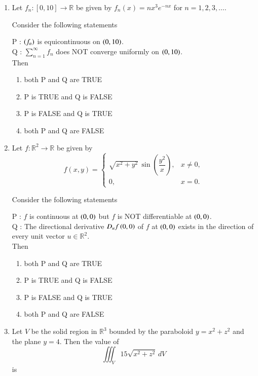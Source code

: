 \documentclass[journal,12pt,onecolumn]{IEEEtran}
\theoremstyle{remark}
\begin{document}
\begin{enumerate}[start=1, label=Q.\arabic*]
\hfill{}
\item Let $f_{n}: [0,10]\to \mathbb{R}$ be given by $f_{n}(x)=n x^{3}e^{-nx}$ for $n=1,2,3,\dots$.  

Consider the following statements\brak{:}

P : $\left(f_{n}\right)$ is equicontinuous on $\left(0,10\right)$.\\
Q : $\sum_{n=1}^{\infty} f_{n}$ does NOT converge uniformly on $\left(0,10\right)$.\\

Then
\begin{enumerate}
\item both P and Q are TRUE
\item P is TRUE and Q is FALSE
\item P is FALSE and Q is TRUE
\item both P and Q are FALSE
\end{enumerate}

\hfill{}


\item Let $f: \mathbb{R}^{2}\to \mathbb{R}$ be given by
\[
f(x,y)=
\begin{cases}
\sqrt{x^{2}+y^{2}} \, \sin\!\left(\dfrac{y^{2}}{x}\right), & x \ne 0,\\[6pt]
0, & x=0.
\end{cases}
\]

Consider the following statements\brak{:}

P : $f$ is continuous at $\left(0,0\right)$ but $f$ is NOT differentiable at $\left(0,0\right)$.\\
Q : The directional derivative $D_{u}f\left(0,0\right)$ of $f$ at $\left(0,0\right)$ exists in the direction of every unit vector $u \in \mathbb{R}^{2}$.\\

Then
\begin{enumerate}
\item both P and Q are TRUE
\item P is TRUE and Q is FALSE
\item P is FALSE and Q is TRUE
\item both P and Q are FALSE
\end{enumerate}

\hfill{}
\item Let $V$ be the solid region in $\mathbb{R}^{3}$ bounded by the paraboloid $y=x^{2}+z^{2}$ and the plane $y=4$.  
Then the value of 
\[
\iiint_{V} 15 \sqrt{x^{2}+z^{2}} \, dV
\]
is
\begin{enumerate}
\end{enumerate}


\end{enumerate}
\end{document}
